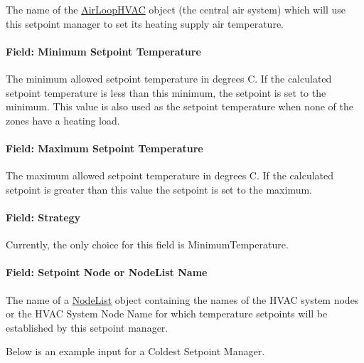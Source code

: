 The name of the \hyperref[airloophvac]{AirLoopHVAC} object (the central air system) which will use this setpoint manager to set its heating supply air temperature.

\paragraph{Field: Minimum Setpoint Temperature}\label{field-minimum-setpoint-temperature-2}

The minimum allowed setpoint temperature in degrees C. If the calculated setpoint temperature is less than this minimum, the setpoint is set to the minimum. This value is also used as the setpoint temperature when none of the zones have a heating load.

\paragraph{Field: Maximum Setpoint Temperature}\label{field-maximum-setpoint-temperature-2}

The maximum allowed setpoint temperature in degrees C. If the calculated setpoint is greater than this value the setpoint is set to the maximum.

\paragraph{Field: Strategy}\label{field-strategy-1}

Currently, the only choice for this field is MinimumTemperature.

\paragraph{Field: Setpoint Node or NodeList Name}\label{field-setpoint-node-or-nodelist-name-11}

The name of a \hyperref[nodelist]{NodeList} object containing the names of the HVAC system nodes or the HVAC System Node Name for which temperature setpoints will be established by this setpoint manager.

Below is an example input for a Coldest Setpoint Manager.

